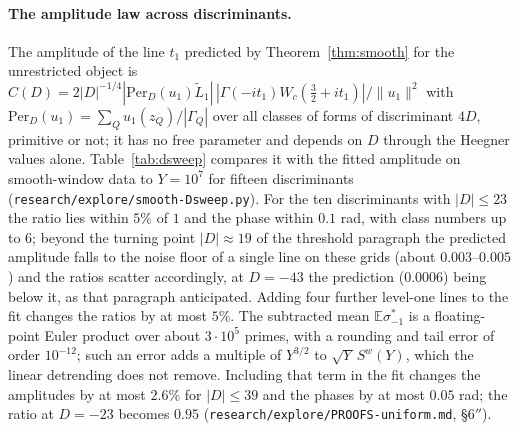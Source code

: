 \documentclass[11pt,a4paper]{article}
\theoremstyle{remark}\newtheorem{remark}[theorem]{Remark}
\begin{document}
\paragraph{The amplitude law across discriminants.} The amplitude of the line $t_1$ predicted by Theorem~\ref{thm:smooth}
for the unrestricted object is $C(D)=2|D|^{-1/4}|\mathrm{Per}_D(u_1)\tilde L_1|\,|\Gamma(-it_1)W_c(\tfrac32+it_1)|/\|u_1\|^2$
with $\mathrm{Per}_D(u_1)=\sum_Q u_1(z_Q)/|\Gamma_Q|$ over all classes of forms of discriminant $4D$, primitive or not; it
has no free parameter and depends on $D$ through the Heegner values alone. Table~\ref{tab:dsweep} compares it with the
fitted amplitude on smooth-window data to $Y=10^7$ for fifteen discriminants
(\texttt{research/explore/smooth-Dsweep.py}). For the ten discriminants with $|D|\le23$ the ratio lies within $5\%$ of
$1$ and the phase within $0.1$ rad, with class numbers up to $6$; beyond the turning point $|D|\approx19$ of the
threshold paragraph the predicted amplitude falls to the noise floor of a single line on these grids (about
$0.003$--$0.005$) and the ratios scatter accordingly, at $D=-43$ the prediction ($0.0006$) being below it, as that
paragraph anticipated. Adding four further level-one lines to the fit changes the ratios by at most $5\%$. The subtracted
mean $\mathbb E\sigma^*_{-1}$ is a floating-point Euler product over about $3\cdot10^5$ primes, with a rounding and tail error of order
$10^{-12}$; such an error adds a multiple of $Y^{3/2}$ to $\sqrt Y\,S^w(Y)$, which the linear detrending does not remove. Including
that term in the fit changes the amplitudes by at most $2.6\%$ for $|D|\le39$ and the phases by at most $0.05$ rad; the ratio at
$D=-23$ becomes $0.95$ (\texttt{research/explore/PROOFS-uniform.md}, \S6$''$).
\end{document}
